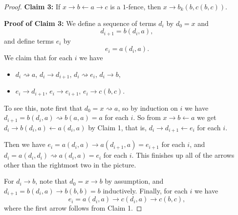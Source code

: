 \documentclass[letterpaper,11pt]{article}
\begin{document}
\begin{proof}
{\bf Claim 3:} If $x \rightarrow b \leftarrow a \rightarrow c$ is a $1$-fence, then $x \rightarrow b_k(b,c(b,c))$.

{\bf Proof of Claim 3:} We define a sequence of terms $d_i$ by $d_0 = x$ and
\[
d_{i+1} = b(d_i,a),
\]
and define terms $e_i$ by
\[
e_i = a(d_i,a).
\]
We claim that for each $i$ we have
\begin{itemize}
\item $d_i \rightsquigarrow a$, $d_i \rightarrow d_{i+1}$, $d_i\rightsquigarrow e_i$, $d_i \rightarrow b$,
\item $e_i\rightarrow d_{i+1}$, $e_i \rightarrow e_{i+1}$, $e_i \rightarrow c(b,c)$.
\end{itemize}
\begin{center}
\end{center}
To see this, note first that $d_0 = x \rightsquigarrow a$, so by induction on $i$ we have $d_{i+1} = b(d_i,a) \rightsquigarrow b(a,a) = a$ for each $i$. So from $x \rightarrow b \leftarrow a$ we get $d_i \rightarrow b(d_i,a) \leftarrow a(d_i,a)$ by Claim 1, that is, $d_i \rightarrow d_{i+1} \leftarrow e_i$ for each $i$.

Then we have $e_i = a(d_i,a) \rightarrow a(d_{i+1},a) = e_{i+1}$ for each $i$, and $d_i = a(d_i,d_i) \rightsquigarrow a(d_i,a) = e_i$ for each $i$. This finishes up all of the arrows other than the rightmost two in the picture.

For $d_i \rightarrow b$, note that $d_0 = x \rightarrow b$ by assumption, and $d_{i+1} = b(d_i,a) \rightarrow b(b,b) = b$ inductively. Finally, for each $i$ we have
\[
e_i = a(d_i,a) \rightarrow c(d_i,a) \rightarrow c(b,c),
\]
where the first arrow follows from Claim 1.


\end{proof}
\end{document}

